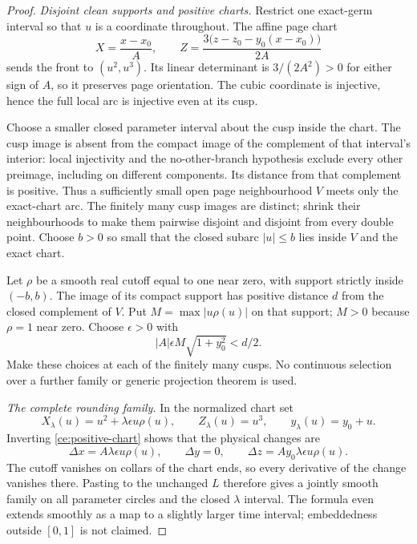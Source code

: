 \begin{proof}\leanok
\par\noindent\emph{Disjoint clean supports and positive charts.} 
Restrict one exact-germ interval so that $u$ is a coordinate throughout.
The affine page chart
\begin{equation}\label{ce:positive-chart}
 X=\frac{x-x_0}{A},\qquad
 Z=\frac{3\bigl(z-z_0-y_0(x-x_0)\bigr)}{2A}
\end{equation}
sends the front to $(u^2,u^3)$. Its linear determinant is
$3/(2A^2)>0$ for either sign of $A$, so it preserves page orientation.
The cubic coordinate is injective, hence the full local arc is injective
even at its cusp.

Choose a smaller closed parameter interval about the cusp inside the
chart. The cusp image is absent from the compact image of the complement
of that interval's interior: local injectivity and the no-other-branch
hypothesis exclude
every other preimage, including on different components. Its distance
from that complement is positive. Thus a sufficiently small open page
neighbourhood $V$ meets only the exact-chart arc. The finitely many cusp
images are distinct; shrink their neighbourhoods to make them pairwise
disjoint and disjoint from every double point. Choose $b>0$ so small
that the closed subarc $|u|\leq b$ lies inside $V$ and the exact chart.

Let $\rho$ be a smooth real cutoff equal to one near zero, with support
strictly inside $(-b,b)$. The image of its compact support has positive
distance $d$ from the closed complement of $V$. Put
$M=\max|u\rho(u)|$ on that support; $M>0$ because $\rho=1$ near zero.
Choose $\epsilon>0$ with
\begin{equation}\label{ce:support-clearance}
 |A|\epsilon M\sqrt{1+y_0^2}<d/2.
\end{equation}
Make these choices at each of the finitely many cusps. No continuous
selection over a further family or generic projection theorem is used.

\par\noindent\emph{The complete rounding family.} 
In the normalized chart set
\begin{equation}\label{ce:rounding-formula}
 X_\lambda(u)=u^2+\lambda\epsilon u\rho(u),\qquad
 Z_\lambda(u)=u^3,\qquad y_\lambda(u)=y_0+u.
\end{equation}
Inverting \eqref{ce:positive-chart} shows that the physical changes are
\begin{equation}\label{ce:physical-displacement}
 \Delta x=A\lambda\epsilon u\rho(u),\qquad \Delta y=0,\qquad
 \Delta z=Ay_0\lambda\epsilon u\rho(u).
\end{equation}
The cutoff vanishes on collars of the chart ends, so every derivative
of the change vanishes there. Pasting to the unchanged $L$ therefore
gives a jointly smooth family on all parameter circles and the closed
$\lambda$ interval. The formula even extends smoothly as a map to a
slightly larger time interval; embeddedness outside $[0,1]$ is not claimed.


\end{proof}
